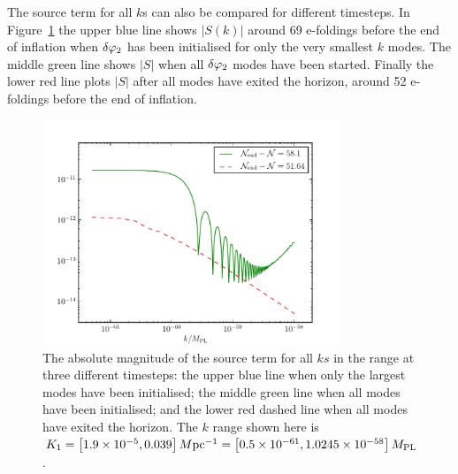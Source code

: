 The source term for all $k$s can also be compared for different timesteps. In
Figure~\ref{fig:src-3ns} the upper blue line shows $|S(k)|$ around 69 e-foldings
before the end of
inflation when $\delta\varphi_{2}$ has been initialised for only the very smallest $k$
modes. The middle green
line shows $|S|$ when all $\delta\varphi_{2}$ modes have been started. Finally the lower red
line plots $|S|$
after all modes have exited the horizon, around 52 e-foldings before the end of
inflation.
% 
\begin{figure}
\centering
\includegraphics[width=0.8\textwidth]{numerical/graphs/src_3ns-large}
\caption[Source term at three different times]{The absolute magnitude of the source 
term for all $ks$ in the range at three different timesteps: the upper blue line when
only the largest modes have been initialised; the middle green line when all modes
have been initialised; and the lower red dashed line when all modes have
exited the horizon. The $k$ range shown here is $K_1=\left[ 1.9\times 10^{-5}, 0.039
\right] M \mathrm{pc}^{-1}= \left[0.5\times 10^{-61}, 1.0245\times 10^{-58}\right]M_{\mathrm{PL}}$.}
\label{fig:src-3ns}
\end{figure}
% 




